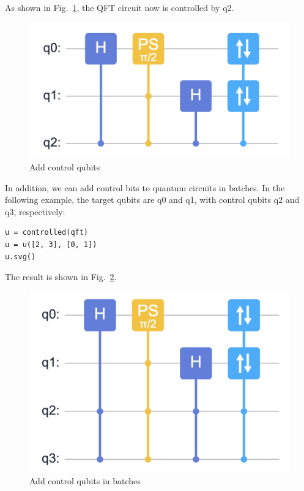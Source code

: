 As shown in Fig.~\ref{fig:controlled-method}, the QFT circuit now is controlled by q2.

\begin{figure}[h]
    \centering
    \includegraphics[width=0.9\linewidth]{2.3_figures/control.png}
    \caption{Add control qubits}
    \label{fig:controlled-method}
\end{figure}

In addition, we can add control bits to quantum circuits in batches. In the following example, the target qubits are q0 and q1, with control qubits q2 and q3, respectively:
\begin{lstlisting}
u = controlled(qft)
u = u([2, 3], [0, 1])
u.svg()
\end{lstlisting}

The result is shown in Fig.~\ref{fig:batch-control}.
\begin{figure}[h]
    \centering
    \includegraphics[width=0.9\linewidth]{2.3_figures/batch_control.png}
    \caption{Add control qubits in batches}
    \label{fig:batch-control}
\end{figure}

